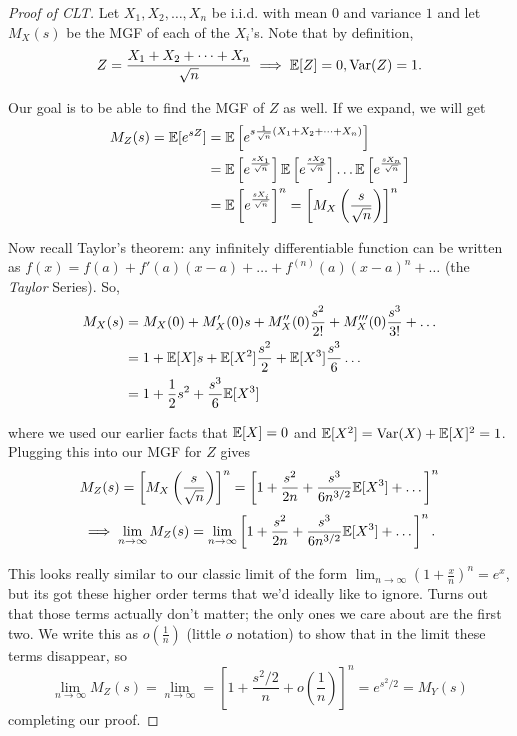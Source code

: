 \documentclass[11 pt]{scrartcl}
\begin{document}
\begin{proof}[Proof of CLT]
Let $X_1, X_2, \dots, X_n$ be i.i.d. with mean $0$ and variance $1$ and let $M_X(s)$ be the MGF of each of the $X_i$'s. Note that by definition, 
\[ Z = \dfrac{X_1 + X_2 + \dots + X_n}{\sqrt{n}} \implies \mathbb E[Z] = 0, \text{Var}(Z) = 1.\] 

Our goal is to be able to find the MGF of $Z$ as well. If we expand, we will get 
\begin{align*}
    M_Z(s) = \mathbb E[e^{sZ}] &= \mathbb E\left[e^{s\frac{1}{\sqrt{n}}(X_1 + X_2 + \dots + X_n)}\right] \\ 
                         &= \mathbb E\left[e^{\frac{sX_1}{\sqrt{n}}}\right] \mathbb E\left[e^{\frac{sX_2}{\sqrt{n}}}\right]\dots  \mathbb E\left[e^{\frac{sX_n}{\sqrt{n}}}\right] \\ 
                         &= \mathbb E\left[e^{\frac{sX_i}{\sqrt{n}}}\right]^n = \left[M_X\left(\frac{s}{\sqrt{n}}\right)\right]^n 
\end{align*}

Now recall Taylor's theorem: any infinitely differentiable function can be written as $f(x) = f(a) + f'(a)(x-a) + \dots + f^{(n)}(a)(x-a)^n + \dots$ (the \emph{Taylor} Series). So, 
\begin{align*}
    M_X(s) &= M_X(0) + M_X'(0)s + M_X''(0)\dfrac{s^2}{2!} + M_X'''(0)\dfrac{s^3}{3!}+\dots\\ 
           &= 1 + \mathbb E[X]s + \mathbb E[X^2]\dfrac{s^2}{2} + \mathbb E[X^3]\dfrac{s^3}{6}\dots \\ 
           &= 1 + \dfrac{1}{2}s^2 + \dfrac{s^3}{6}\mathbb E[X^3] 
\end{align*}

where we used our earlier facts that $\mathbb E[X] = 0$ and $\mathbb E[X^2] = \text{Var}(X)+\mathbb E[X]^2 = 1$. Plugging this into our MGF for $Z$ gives 
\[ M_Z(s) = \left[M_X\left(\frac{s}{\sqrt{n}}\right)\right]^n = \left[1 + \dfrac{s^2}{2n} + \dfrac{s^3}{6n^{3/2}}\mathbb E[X^3] + \dots \right]^n\]  
\[ \implies \lim_{n\to\infty} M_Z(s) = \lim_{n\to\infty} \left[ 1 + \dfrac{s^2}{2n} + \dfrac{s^3}{6n^{3/2}}\mathbb E[X^3] + \dots \right]^n.\] 

This looks really similar to our classic limit of the form $\lim_{n\to\infty}(1+\frac{x}{n})^n = e^x$, but its got these higher order terms that we'd ideally like to ignore. Turns out that those terms actually don't matter; the only ones we care about are the first two. We write this as $o(\frac{1}{n})$ (little $o$ notation) to show that in the limit these terms disappear, so 
\[ \lim_{n\to\infty} M_Z(s) = \lim_{n\to\infty} = \left[1+\dfrac{s^2/2}{n} + o\left(\dfrac{1}{n}\right)\right]^n = e^{s^2/2} = M_Y(s)\] 
completing our proof. 
\end{proof}
\end{document}
